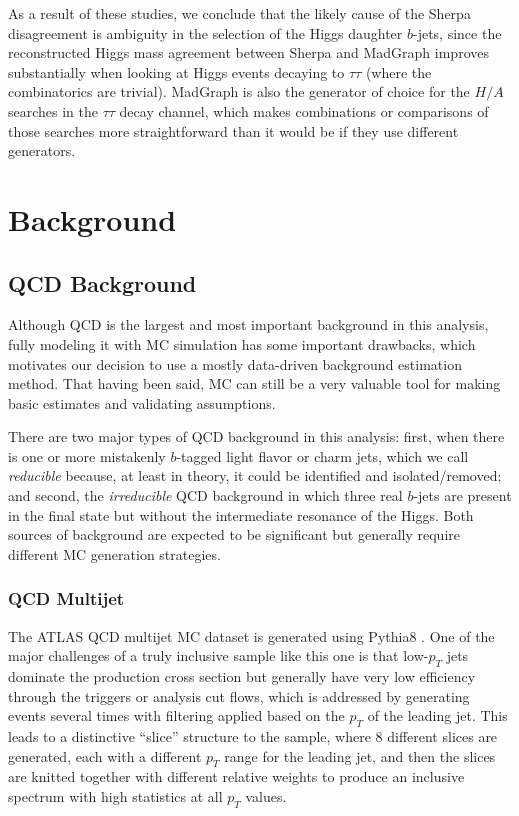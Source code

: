 As a result of these studies, we conclude that the likely cause of the Sherpa 
disagreement is ambiguity in the selection of the Higgs daughter $b$-jets, since
the reconstructed Higgs mass agreement between Sherpa and MadGraph improves substantially when looking
at Higgs events decaying to $\tau\tau$ (where the combinatorics are trivial).
MadGraph is also the generator of choice for the $H/A$ searches in the $\tau\tau$ 
decay channel, which makes combinations or comparisons of those searches
more straightforward than it would be if they use different generators.

\section{Background}
\subsection{QCD Background}
Although QCD is the largest and most important background in this analysis, fully modeling 
it with MC simulation has some important drawbacks, which motivates our decision to use a 
mostly data-driven background estimation method.  That having been said, MC can 
still be a very valuable tool for making basic estimates and validating assumptions. 

There are two major types of QCD background in this analysis: first, when 
there is one or more mistakenly $b$-tagged light flavor or charm jets, 
which we call \textit{reducible} because, at least in theory, 
it could be identified and isolated/removed; and second, the \textit{irreducible} 
QCD background in which three real $b$-jets are present in the final 
state but without the intermediate resonance of the Higgs.  Both sources of background are 
expected to be significant but generally require different MC generation strategies.



\subsubsection{QCD Multijet}
The ATLAS QCD multijet MC dataset is generated using Pythia8 \cite{Pythia8}.  
One of the major challenges of a truly inclusive sample like this one is that 
low-$p_T$ jets dominate the production cross section but generally have 
very low efficiency through the triggers or analysis cut flows, which is addressed by 
generating events several times with filtering applied based on the $p_T$ 
of the leading jet.  This leads to a distinctive ``slice'' structure to 
the sample, where 8 different slices are generated, each with a different $p_T$ 
range for the leading jet, and then the slices are knitted together with different 
relative weights to produce an inclusive spectrum with high statistics at all $p_T$ values.  

